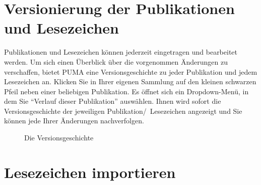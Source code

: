 \section{Versionierung der Publikationen und Lesezeichen}
Publikationen und Lesezeichen können jederzeit eingetragen und bearbeitet werden. Um sich einen Überblick über die vorgenommen Änderungen zu verschaffen, bietet PUMA eine Versionsgeschichte zu jeder Publikation und jedem Lesezeichen an. Klicken Sie in Ihrer eigenen Sammlung auf den kleinen schwarzen Pfeil neben einer beliebigen Publikation. Es öffnet sich ein Dropdown-Menü, in dem Sie \enquote{Verlauf dieser Publikation} auswählen. Ihnen wird sofort die Versionsgeschichte der jeweiligen Publikation/~Lesezeichen angezeigt und Sie können jede Ihrer Änderungen nachverfolgen. 
\begin{figure}[h!]
 \centering
 \caption{Die Versionsgeschichte}
 \label{figure012}
\end{figure} 
\section{Lesezeichen importieren}
